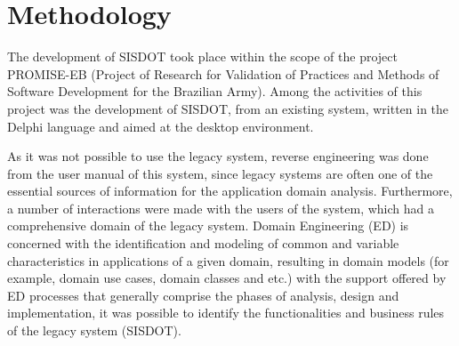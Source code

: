 \section{Methodology}\label{sec:Methodology}


The development of SISDOT took place within the scope of the project PROMISE-EB (Project of Research for Validation of Practices and Methods of Software Development for the Brazilian Army). Among the activities of this project was the development of SISDOT, from an existing system, written in the Delphi language and aimed at the desktop environment.


As it was not possible to use the legacy system, reverse engineering was done from the user manual of this system, since legacy systems are often one of the essential sources of information for the application domain analysis. Furthermore, a number of interactions were made with the users of the system, which had a comprehensive domain of the legacy system. Domain Engineering (ED) is concerned with the identification and modeling of common and variable characteristics in applications of a given domain, resulting in domain models (for example, domain use cases, domain classes and etc.) with the support offered by ED processes that generally comprise the phases of analysis, design and implementation, it was possible to identify the functionalities and business rules of the legacy system (SISDOT).

